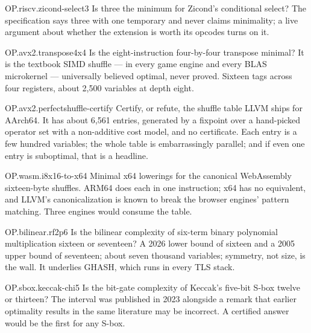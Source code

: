 \begin{artifact}{OP.riscv.zicond-select3}
Is three the minimum for Zicond's conditional select? The specification says three with one temporary and never claims minimality; a live argument about whether the extension is worth its opcodes turns on it.
\end{artifact}

\begin{artifact}{OP.avx2.transpose4x4}
Is the eight-instruction four-by-four transpose minimal? It is the textbook SIMD shuffle --- in every game engine and every BLAS microkernel --- universally believed optimal, never proved. Sixteen tags across four registers, about 2,500 variables at depth eight.
\end{artifact}

\begin{artifact}{OP.avx2.perfectshuffle-certify}
Certify, or refute, the shuffle table LLVM ships for AArch64. It has about 6,561 entries, generated by a fixpoint over a hand-picked operator set with a non-additive cost model, and no certificate. Each entry is a few hundred variables; the whole table is embarrassingly parallel; and if even one entry is suboptimal, that is a headline.
\end{artifact}

\begin{artifact}{OP.wasm.i8x16-to-x64}
Minimal x64 lowerings for the canonical WebAssembly sixteen-byte shuffles. ARM64 does each in one instruction; x64 has no equivalent, and LLVM's canonicalization is known to break the browser engines' pattern matching. Three engines would consume the table.
\end{artifact}

\begin{artifact}{OP.bilinear.rf2p6}
Is the bilinear complexity of six-term binary polynomial multiplication sixteen or seventeen? A 2026 lower bound of sixteen and a 2005 upper bound of seventeen; about seven thousand variables; symmetry, not size, is the wall. It underlies GHASH, which runs in every TLS stack.
\end{artifact}

\begin{artifact}{OP.sbox.keccak-chi5}
Is the bit-gate complexity of Keccak's five-bit S-box twelve or thirteen? The interval was published in 2023 alongside a remark that earlier optimality results in the same literature may be incorrect. A certified answer would be the first for any S-box.
\end{artifact}


